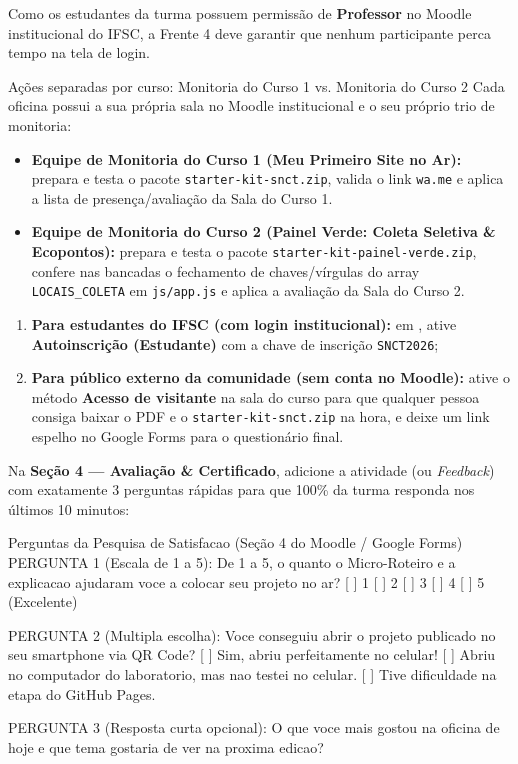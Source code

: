 Como os estudantes da turma possuem permissão de \textbf{Professor} no Moodle institucional do IFSC, a Frente 4 deve garantir que nenhum participante perca tempo na tela de login.

\begin{dica}{Ações separadas por curso: Monitoria do Curso 1 vs. Monitoria do Curso 2}
Cada oficina possui a sua própria sala no Moodle institucional e o seu próprio trio de monitoria:
\begin{itemize}[leftmargin=1.4em, itemsep=0.2em]
  \item \textbf{Equipe de Monitoria do Curso 1 (Meu Primeiro Site no Ar):} prepara e testa o pacote \texttt{starter-kit-snct.zip}, valida o link \texttt{wa.me} e aplica a lista de presença/avaliação da Sala do Curso 1.
  \item \textbf{Equipe de Monitoria do Curso 2 (Painel Verde: Coleta Seletiva \& Ecopontos):} prepara e testa o pacote \texttt{starter-kit-painel-verde.zip}, confere nas bancadas o fechamento de chaves/vírgulas do array \texttt{LOCAIS\_COLETA} em \texttt{js/app.js} e aplica a avaliação da Sala do Curso 2.
\end{itemize}
\end{dica}

\begin{enumerate}[leftmargin=1.4em, itemsep=0.25em]
  \item \textbf{Para estudantes do IFSC (com login institucional):} em \seta{}, ative \textbf{Autoinscrição (Estudante)} com a chave de inscrição \texttt{SNCT2026};
  \item \textbf{Para público externo da comunidade (sem conta no Moodle):} ative o método \textbf{Acesso de visitante} na sala do curso para que qualquer pessoa consiga baixar o PDF e o \texttt{starter-kit-snct.zip} na hora, e deixe um link espelho no Google Forms para o questionário final.
\end{enumerate}


Na \textbf{Seção 4 — Avaliação \& Certificado}, adicione a atividade  (ou \emph{Feedback}) com exatamente 3 perguntas rápidas para que 100\% da turma responda nos últimos 10 minutos:

\begin{codigo}[txt]{Perguntas da Pesquisa de Satisfacao (Seção 4 do Moodle / Google Forms)}
PERGUNTA 1 (Escala de 1 a 5):
De 1 a 5, o quanto o Micro-Roteiro e a explicacao ajudaram voce a colocar seu projeto no ar?
[ ] 1   [ ] 2   [ ] 3   [ ] 4   [ ] 5 (Excelente)

PERGUNTA 2 (Multipla escolha):
Voce conseguiu abrir o projeto publicado no seu smartphone via QR Code?
[ ] Sim, abriu perfeitamente no celular!
[ ] Abriu no computador do laboratorio, mas nao testei no celular.
[ ] Tive dificuldade na etapa do GitHub Pages.

PERGUNTA 3 (Resposta curta opcional):
O que voce mais gostou na oficina de hoje e que tema gostaria de ver na proxima edicao?
\end{codigo}

